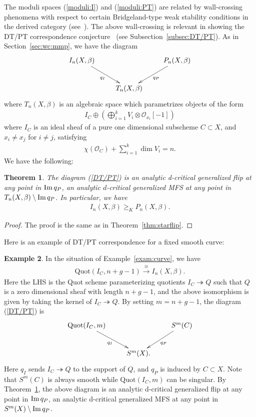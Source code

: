 \documentclass[11pt]{amsart}
\theoremstyle{plain}
\newtheorem{thm}{Theorem}[section]
\theoremstyle{definition}
\newtheorem{exam}[thm]{Example}
\theoremstyle{remark}
\newcommand{\oO}{\mathcal{O}}
\newcommand{\Imm}{\mathop{\rm Im}\nolimits}
\begin{document}
The moduli spaces (\ref{moduli:I}) and (\ref{moduli:PT})
are related by wall-crossing phenomena with respect to 
certain Bridgeland-type 
weak stability conditions 
in the derived category (see~\cite{Tcurve1}).
The above wall-crossing is relevant 
in showing the DT/PT correspondence 
conjecture~\cite{PT} (see Subsection~\ref{subsec:DT/PT}).  
As in Section~\ref{sec:wc:mmp}, we have the diagram
\begin{align}\label{DT/PT}
\xymatrix{
I_n(X, \beta) \ar[rd]_-{q_I} &  &  P_n(X, \beta) \ar[ld]^-{q_P} \\
& T_n(X, \beta) &}
\end{align}
where $T_n(X, \beta)$ is an algebraic space which 
parametrizes 
objects of the form
\begin{align*}
I_C \oplus \left(\bigoplus_{i=1}^k V_i \otimes \oO_{x_i}[-1] \right)
\end{align*}
where $I_C$ is an ideal sheaf of a pure one 
dimensional subscheme $C \subset X$, 
and $x_i \neq x_j$ for $i \neq j$, 
satisfying
\begin{align*}
\chi(\oO_C)+\sum_{i=1}^k \dim V_i =n.
\end{align*}
We have the following: 
\begin{thm}\label{thm:DT/PT}
The diagram (\ref{DT/PT}) is an analytic 
d-critical generalized flip 
at any point in $\Imm q_P$, 
an analytic $d$-critical generalized MFS
at any point in $T_n(X, \beta) \setminus \Imm q_P$. 
In particular, we have 
\begin{align*}
I_n(X, \beta) \ge_K P_n(X, \beta).
\end{align*}
\end{thm}
\begin{proof}
The proof is the same as in Theorem~\ref{thm:starflip}. 
\end{proof}

Here is an example of DT/PT correspondence for 
a fixed smooth curve:
\begin{exam}\label{exam:DTC}
In the situation of Example~\ref{exam:curve}, 
we have
\begin{align*}
\mathrm{Quot}(I_C, n+g-1) \stackrel{\cong}{\to}
I_n(X, \beta).
\end{align*}
Here the LHS is the Quot scheme parameterizing 
quotients $I_C \twoheadrightarrow Q$ 
such that $Q$ is a zero dimensional sheaf with 
length $n+g-1$, and the above isomorphism is given 
by taking the kernel of $I_C \twoheadrightarrow Q$. 
By setting $m=n+g-1$, the diagram (\ref{DT/PT}) is 
\begin{align}\notag
\xymatrix{
\mathrm{Quot}(I_C, m) \ar[rd]_-{q_I} &  & S^m(C) \ar[ld]^-{q_P} \\
& S^m(X). &}
\end{align}
Here $q_I$ sends $I_C \twoheadrightarrow Q$ to the support of $Q$, 
and $q_P$ is induced by $C \subset X$. 
Note that $S^m(C)$ is always smooth while 
$\mathrm{Quot}(I_C, m)$ can be singular. 
By Theorem~\ref{thm:DT/PT}, 
the above diagram is an analytic d-critical generalized 
flip at any point in $\Imm q_P$, 
an analytic d-critical generalized MFS
at any point in $S^m(X) \setminus \Imm q_P$. 
\end{exam}
\end{document}
